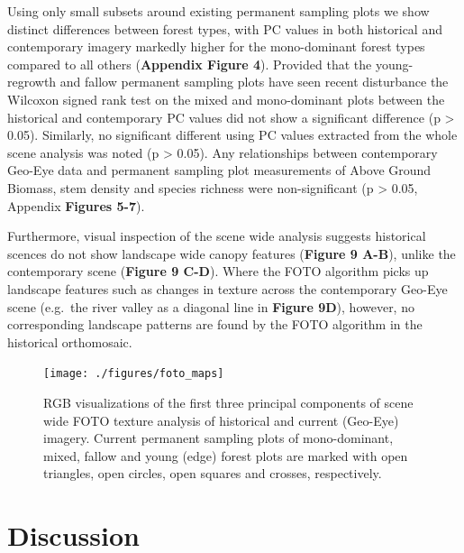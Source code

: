 \documentclass[remote sensing,article,submit,moreauthors,pdftex]{mdpi}
\begin{document}
Using only small subsets around existing permanent sampling plots we
show distinct differences between forest types, with PC values in both
historical and contemporary imagery markedly higher for the
mono-dominant forest types compared to all others (\textbf{Appendix
Figure 4}). Provided that the young-regrowth and fallow permanent
sampling plots have seen recent disturbance the Wilcoxon signed rank
test on the mixed and mono-dominant plots between the historical and
contemporary PC values did not show a significant difference (p
\textgreater{} 0.05). Similarly, no significant different using PC
values extracted from the whole scene analysis was noted (p
\textgreater{} 0.05). Any relationships between contemporary Geo-Eye
data and permanent sampling plot measurements of Above Ground Biomass,
stem density and species richness were non-significant (p \textgreater{}
0.05, Appendix \textbf{Figures 5-7}).

Furthermore, visual inspection of the scene wide analysis suggests
historical scences do not show landscape wide canopy features
(\textbf{Figure 9 A-B}), unlike the contemporary scene (\textbf{Figure 9
C-D}). Where the FOTO algorithm picks up landscape features such as
changes in texture across the contemporary Geo-Eye scene (e.g.~the river
valley as a diagonal line in \textbf{Figure 9D}), however, no
corresponding landscape patterns are found by the FOTO algorithm in the
historical orthomosaic.

\begin{figure}

{\centering \texttt{[image: ./figures/foto\_maps]} 

}

\caption{RGB visualizations of the first three principal components of scene wide FOTO texture analysis of historical and current (Geo-Eye) imagery. Current permanent sampling plots of mono-dominant, mixed, fallow and young (edge) forest plots are marked with open triangles, open circles, open squares and crosses, respectively.}\label{fig:unnamed-chunk-13}
\end{figure}

\hypertarget{discussion}{%
\section{Discussion}\label{discussion}}
\end{document}
